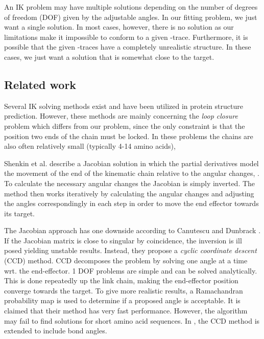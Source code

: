 An IK problem may have multiple solutions depending on the number of degrees of freedom (DOF) given by the adjustable angles.
In our fitting problem, we just want a single solution.
In most cases, however, there is no solution as our limitations make it impossible to conform to a given \Ca-trace.
Furthermore, it is possible that the given \Ca-traces have a completely unrealistic structure.
In these cases, we just want a solution that is somewhat close to the target.


\subsection{Related work}
Several IK solving methods exist and have been utilized in protein
structure prediction.  However, these methods are mainly concerning
the \emph{loop closure} problem \cite{coutsias2004kinematic} which
differs from our problem, since the only constraint is that the
position two ends of the chain must be locked. In these problems the
chains are also often relatively small (typically 4-14 amino acids),

  
Shenkin et al. describe a Jacobian solution in which the partial derivatives model the movement of the end of the kinematic chain relative to the angular changes, \cite{shenkin1987}.
To calculate the necessary angular changes the Jacobian is simply inverted.
The method then works iteratively by calculating the angular changes and adjusting the angles correspondingly in each step in order to move the end effector towards its target.

The Jacobian approach has one downside according to Canutescu and Dunbrack
\cite{canutescu2003}.
If the Jacobian matrix is close to singular by coincidence, the inversion is ill posed yielding unstable results.
Instead, they propose a \emph{cyclic coordinate descent} (CCD) method.
CCD decomposes the problem by solving one angle at a time wrt. the end-effector.
1 DOF problems are simple and can be solved analytically.
This is done repeatedly up the link chain, making the end-effector position converge towards the target.
To give more realistic results, a Ramachandran probability map is used to determine if a proposed angle is acceptable. 
It is claimed that their method has very fast performance. 
However, the algorithm may fail to find solutions for short amino acid sequences.
In \cite{boomsma2005full}, the CCD method is extended to include bond angles.

